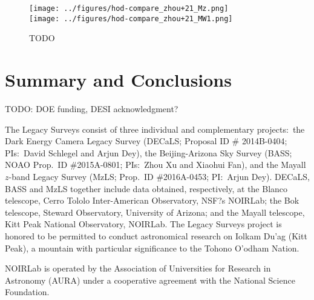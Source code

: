 \documentclass[twocolumn,apj,iop,tighten]{emulateapj2}
\begin{document}
\begin{figure*}
\centering
\texttt{[image: ../figures/hod-compare\_zhou+21\_Mz.png]} \\
\texttt{[image: ../figures/hod-compare\_zhou+21\_MW1.png]}
\caption{TODO
}
\label{fig:hod_compare}
\end{figure*}





\section{Summary and Conclusions}\label{}


\acknowledgements

TODO: DOE funding, DESI acknowledgment?

The Legacy Surveys consist of three individual and complementary projects:\ the Dark Energy Camera Legacy Survey (DECaLS; Proposal ID \# 2014B-0404; PIs:\ David Schlegel and Arjun Dey), the Beijing-Arizona Sky Survey (BASS; NOAO Prop.\ ID \#2015A-0801; PIs:\ Zhou Xu and Xiaohui Fan), and the Mayall $z$-band Legacy Survey (MzLS; Prop.\ ID \#2016A-0453; PI:\ Arjun Dey). DECaLS, BASS and MzLS together include data obtained, respectively, at the Blanco telescope, Cerro Tololo Inter-American Observatory, NSF?s NOIRLab; the Bok telescope, Steward Observatory, University of Arizona; and the Mayall telescope, Kitt Peak National Observatory, NOIRLab. The Legacy Surveys project is honored to be permitted to conduct astronomical research on Iolkam Du'ag (Kitt Peak), a mountain with particular significance to the Tohono O'odham Nation.

NOIRLab is operated by the Association of Universities for Research in Astronomy (AURA) under a cooperative agreement with the National Science Foundation.
\end{document}
